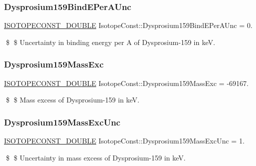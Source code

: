 \subsubsection{\texorpdfstring{Dysprosium159\+Bind\+E\+Per\+A\+Unc}{Dysprosium159BindEPerAUnc}}
{\footnotesize\ttfamily \mbox{\hyperlink{group___isotope_const-_macros_ga8f45a7272ce02c0b4c65c44636ed719a}{I\+S\+O\+T\+O\+P\+E\+C\+O\+N\+S\+T\+\_\+\+D\+O\+U\+B\+LE}} Isotope\+Const\+::\+Dysprosium159\+Bind\+E\+Per\+A\+Unc = 0.}

\$ \$ Uncertainty in binding energy per A of Dysprosium-\/159 in keV. \mbox{\label{group___isotope_const-_dysprosium-_dy159_ga7ea56f66d9168132293f0ec5cca2db2e}} 
\subsubsection{\texorpdfstring{Dysprosium159\+Mass\+Exc}{Dysprosium159MassExc}}
{\footnotesize\ttfamily \mbox{\hyperlink{group___isotope_const-_macros_ga8f45a7272ce02c0b4c65c44636ed719a}{I\+S\+O\+T\+O\+P\+E\+C\+O\+N\+S\+T\+\_\+\+D\+O\+U\+B\+LE}} Isotope\+Const\+::\+Dysprosium159\+Mass\+Exc = -\/69167.}

\$ \$ Mass excess of Dysprosium-\/159 in keV. \mbox{\label{group___isotope_const-_dysprosium-_dy159_gad84fa78052c227895f49a33a83154117}} 
\subsubsection{\texorpdfstring{Dysprosium159\+Mass\+Exc\+Unc}{Dysprosium159MassExcUnc}}
{\footnotesize\ttfamily \mbox{\hyperlink{group___isotope_const-_macros_ga8f45a7272ce02c0b4c65c44636ed719a}{I\+S\+O\+T\+O\+P\+E\+C\+O\+N\+S\+T\+\_\+\+D\+O\+U\+B\+LE}} Isotope\+Const\+::\+Dysprosium159\+Mass\+Exc\+Unc = 1.}

\$ \$ Uncertainty in mass excess of Dysprosium-\/159 in keV. \mbox{\label{group___isotope_const-_dysprosium-_dy159_ga5c4e0870447696bd35ce6b7a6cf46334}} 
